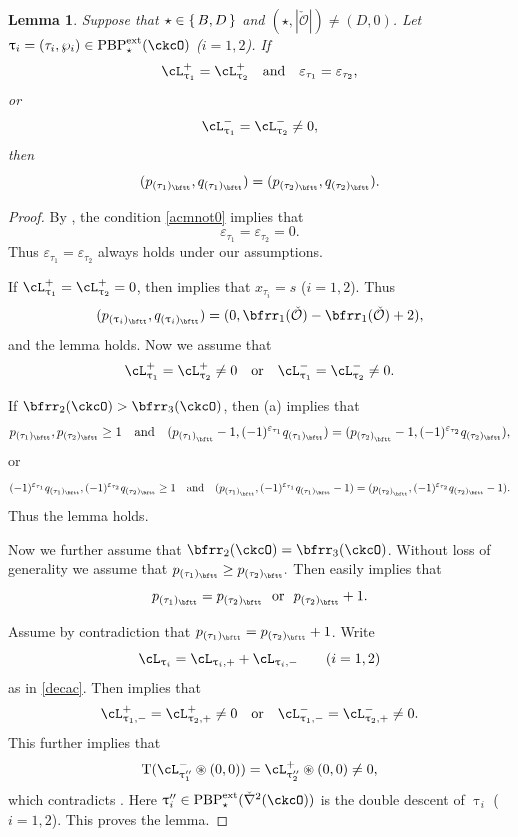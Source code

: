 \documentclass[11pt,a4paper]{amsart}
\def\abs#1{\left|{#1}\right|}
\newcommand{\CO}{{\mathcal {O}}}
\def\DD{\nabla}
\newcommand{\be}{\begin {equation}}
\newcommand{\ee}{\end {equation}}
\numberwithin{equation}{section}
\newtheorem{lem}[thm]{Lemma}
\theoremstyle{remark}
\def\PBPe{\mathrm{PBP}^{\mathrm{ext}}}
\def\PBPes{\mathrm{PBP}^{\mathrm{ext}}_{\star}}
\def\ckDD{{\check\DD}}
\def\maltese{\mathrm{T}}
\def\pac#1{\ac_{#1}^+}
\def\nac#1{\ac_{#1}^-}
\def\ac{\cL}
\begin{document}
\begin{lem}\label{lem:signbd}
Suppose that $\star \in \set{B,D}$ and $(\star, \abs{\check \CO})\neq (D, 0)$. 
Let $\uptau_i=(\tau_i, \wp_i)\in \PBPe_\star(\ckcO)$ ($i=1,2$). If
  \[
    \ac_{\uptau_1}^+= \ac_{\uptau_2}^+\quad \textrm{and}\quad \varepsilon_{\tau_1}=\varepsilon_{\tau_2},
  \]
  or 
  \be\label{acmnot0}
  \ac_{\uptau_1}^-= \ac_{\uptau_2}^-\neq 0,
  \ee
  then
  \[
      (p_{(\tau_1)_\bftt}, q_{(\tau_1)_\bftt}) =(p_{(\tau_2)_\bftt}, q_{(\tau_2)_\bftt}).
  \]
\end{lem}
\begin{proof}
By , the  condition \eqref{acmnot0}  implies that
\[
\varepsilon_{\tau_1}=\varepsilon_{\tau_2}=0.
\]
Thus $\varepsilon_{\tau_1}=\varepsilon_{\tau_2}$ always holds under our assumptions. 

If $\ac_{\uptau_1}^+= \ac_{\uptau_2}^+=0$, then  implies that $x_{\tau_i}=s$ ($i=1,2$). Thus 
\[
      (p_{(\uptau_i)_\bftt}, q_{(\uptau_i)_\bftt}) =(0,  \bfrr_1(\check \CO)-\bfrr_1(\check \CO) +2),
  \]
  and the lemma holds.
  Now we assume that 
 \[  \ac_{\uptau_1}^+= \ac_{\uptau_2}^+\neq 0\quad \textrm{or}\quad \ac_{\uptau_1}^-= \ac_{\uptau_2}^-\neq 0.
 \]
 
 If $\bfrr_2(\ckcO)>\bfrr_3(\ckcO)$, then  (a) implies that 
 \[
  p_{(\tau_1)_\bftt},  p_{(\tau_2)_\bftt}\geq 1\quad \textrm{and}\quad 
  (p_{{(\tau_1)}_{\bftt}}-1, (-1)^{\varepsilon_{\tau_1}}q_{(\tau_1)_{\bftt}})=
   (p_{{(\tau_2)}_{\bftt}}-1, (-1)^{\varepsilon_{\tau_2}}q_{(\tau_2)_{\bftt}}),
\]
or 
\[
  (-1)^{\varepsilon_{\tau_1}}q_{(\tau_1)_{\bftt}},  (-1)^{\varepsilon_{\tau_2}}q_{(\tau_2)_{\bftt}}\geq 1\quad \textrm{and}\quad 
  (p_{{(\tau_1)}_{\bftt}}, (-1)^{\varepsilon_{\tau_1}}q_{(\tau_1)_{\bftt}}-1)=
   (p_{{(\tau_2)}_{\bftt}}, (-1)^{\varepsilon_{\tau_2}}q_{(\tau_2)_{\bftt}}-1).
\]
Thus the lemma holds.


Now we further assume that $\bfrr_2(\ckcO)=\bfrr_3(\ckcO)$. Without loss of generality we assume that
$
  p_{(\tau_1)_{\bftt}}\geq p_{(\tau_2)_{\bftt}}.
$
Then   easily implies that
\[
   p_{(\tau_1)_{\bftt}}= p_{(\tau_2)_{\bftt}}\ \textrm{ or }\ p_{(\tau_2)_{\bftt}}+1. 
\]


Assume by contradiction that $p_{(\tau_1)_{\bftt}}= p_{(\tau_2)_{\bftt}}+1$. 
Write 
\[
  \ac_{\uptau_i}=\ac_{\uptau_i, +}+\ac_{\uptau_i,-}\qquad (i=1,2)
\]
as in \eqref{decac}. 
Then    implies that
\[
  \ac_{\uptau_1, -}^+=\ac_{\uptau_2, +}^+\neq 0\quad \textrm{or}\quad \ac_{\uptau_1, -}^-=\ac_{\uptau_2, +}^-\neq 0.
\]
This further implies that 
\[
\maltese(\nac{\uptau_1''}\circledast (0,0) ) =
    \pac{\uptau_2''}\circledast (0,0) \neq 0,
    \]
    which contradicts . Here $\uptau_i''\in \PBPes{(\ckDD^2(\ckcO))}$ is the double descent of $\uptau_i$ ($i=1,2$). This proves the lemma. 
\end{proof}
\end{document}
